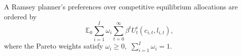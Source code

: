 \documentclass[thmsb,11pt]{article}
\begin{document}






A Ramsey planner's preferences over  competitive equilibrium allocations are ordered by
\begin{equation}
\mathbb{E}_{0}\sum_{i=1}^{I}\omega_{i}\sum_{t=0}^{\infty}\beta^{t}U_{t}^{i}\left(c_{i,t},l_{i,t}\right),\label{govmt objective}
\end{equation}
where the Pareto weights satisfy $\omega_{i}\geq0,$ $\sum_{i=1}^{I}\omega_{i}=1$.

\end{document}
